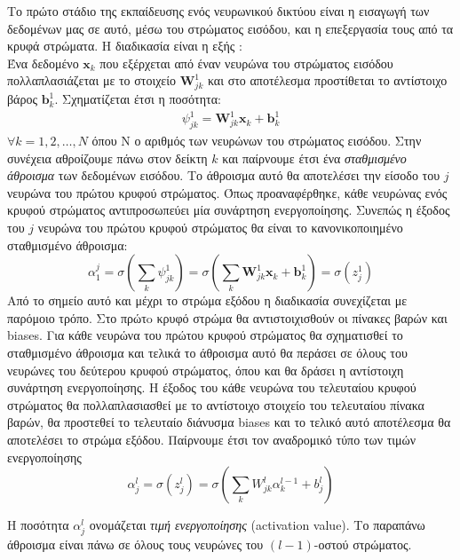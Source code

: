 \documentclass[11pt]{article} %
\numberwithin{equation}{subsection}
\begin{document}
Το πρώτο στάδιο της εκπαίδευσης ενός νευρωνικού δικτύου είναι η εισαγωγή των δεδομένων μας σε αυτό, μέσω του στρώματος εισόδου, και η επεξεργασία τους από τα κρυφά στρώματα. Η διαδικασία είναι η εξής \cite{neuralnets2}: \\
Ένα δεδομένο $\textbf{x}_k$ που εξέρχεται από έναν νευρώνα του στρώματος εισόδου πολλαπλασιάζεται με το στοιχείο $\textbf{W}_{jk} ^{1}$ και στο αποτέλεσμα προστίθεται το αντίστοιχο βάρος  $\textbf{b}^{1}_{k}$. Σχηματίζεται έτσι η ποσότητα:
\begin{align*}
\psi_{jk} ^ {1}   =  \textbf{W}_{jk} ^{1} \textbf{x}_k + \textbf{b}_k ^{1}
\end{align*}
 $\forall k = 1, 2, \dots, Ν$ όπου Ν ο αριθμός των νευρώνων του στρώματος εισόδου. Στην συνέχεια αθροίζουμε πάνω στον δείκτη $k$ και παίρνουμε έτσι ένα \textit{σταθμισμένο άθροισμα} των δεδομένων εισόδου. Το άθροισμα αυτό θα αποτελέσει την είσοδο του $j$ νευρώνα του πρώτου κρυφού στρώματος. Όπως προαναφέρθηκε, κάθε νευρώνας ενός κρυφού στρώματος αντιπροσωπεύει μία συνάρτηση ενεργοποίησης. Συνεπώς η έξοδος του $j$ νευρώνα του πρώτου κρυφού στρώματος θα είναι το {κανονικοποιημένο σταθμισμένο άθροισμα}:
\begin{equation}
\displaystyle \alpha^{j}_{1} = \sigma \left( \sum_{k} \psi_{jk} ^ 1 \right)  =  \sigma \left(\sum_{k} \textbf{W}_{jk} ^{1} \textbf{x}_k + \textbf{b}_{k}^{1}  \right) = \sigma \left( z_{j}^{1} \right)
\end{equation}
Από το σημείο αυτό και μέχρι το στρώμα εξόδου η διαδικασία συνεχίζεται με παρόμοιο τρόπο. Στο πρώτo κρυφό στρώμα θα αντιστοιχισθούν οι πίνακες βαρών και biases. Για κάθε νευρώνα του πρώτου κρυφού στρώματος θα σχηματισθεί το σταθμισμένο άθροισμα και τελικά το άθροισμα αυτό θα περάσει σε όλους του νευρώνες του δεύτερου κρυφού στρώματος, όπου και θα δράσει η αντίστοιχη συνάρτηση ενεργοποίησης. Η έξοδος του κάθε νευρώνα του τελευταίου κρυφού στρώματος θα πολλαπλασιασθεί με το αντίστοιχο στοιχείο του τελευταίου πίνακα βαρών, θα προστεθεί το τελευταίο διάνυσμα biases και το τελικό αυτό αποτέλεσμα θα αποτελέσει το στρώμα εξόδου. Παίρνουμε έτσι τον αναδρομικό τύπο των τιμών ενεργοποίησης\\
\begin{equation}
\alpha_{j}^{l} = \sigma (z_{j}^{l}) = \sigma \left( \sum_{k} W^{l}_{jk} \alpha^{l-1}_{k} + b_{j}^{l} \right)
\end{equation}

Η ποσότητα $\alpha_{j} ^ {l}$ ονομάζεται \textit{τιμή ενεργοποίησης} (activation value). Το παραπάνω άθροισμα είναι πάνω σε όλους τους νευρώνες του $(l-1)$-οστού στρώματος.
\end{document}
